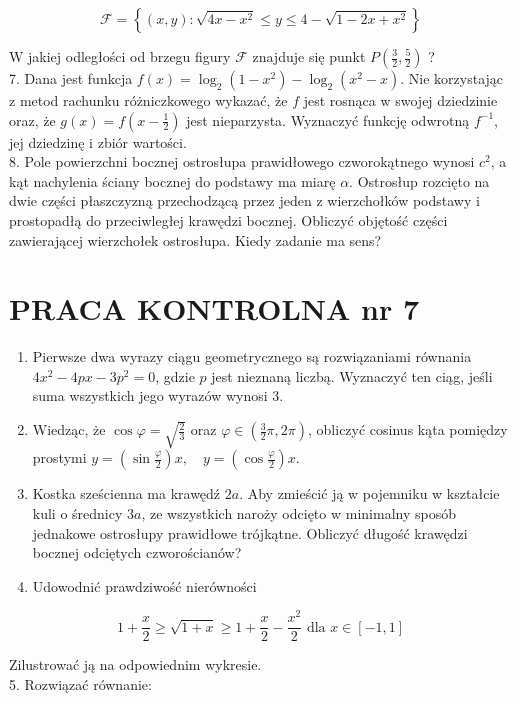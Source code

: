 \documentclass[10pt]{article}
\begin{document}
$$
\mathcal{F}=\left\{(x, y): \sqrt{4 x-x^{2}} \leqslant y \leqslant 4-\sqrt{1-2 x+x^{2}}\right\}
$$

W jakiej odległości od brzegu figury $\mathcal{F}$ znajduje się punkt $P\left(\frac{3}{2}, \frac{5}{2}\right)$ ?\\
7. Dana jest funkcja $f(x)=\log _{2}\left(1-x^{2}\right)-\log _{2}\left(x^{2}-x\right)$. Nie korzystając z metod rachunku różniczkowego wykazać, że $f$ jest rosnąca w swojej dziedzinie oraz, że $g(x)=f\left(x-\frac{1}{2}\right)$ jest nieparzysta. Wyznaczyć funkcję odwrotną $f^{-1}$, jej dziedzinę i zbiór wartości.\\
8. Pole powierzchni bocznej ostrosłupa prawidłowego czworokątnego wynosi $c^{2}$, a kąt nachylenia ściany bocznej do podstawy ma miarę $\alpha$. Ostrosłup rozcięto na dwie części płaszczyzną przechodzącą przez jeden z wierzchołków podstawy i prostopadłą do przeciwległej krawędzi bocznej. Obliczyć objętość części zawierającej wierzchołek ostrosłupa. Kiedy zadanie ma sens?

\section*{PRACA KONTROLNA nr 7}
\begin{enumerate}
  \item Pierwsze dwa wyrazy ciągu geometrycznego są rozwiązaniami równania $4 x^{2}-4 p x-3 p^{2}=0$, gdzie $p$ jest nieznaną liczbą. Wyznaczyć ten ciąg, jeśli suma wszystkich jego wyrazów wynosi 3.
  \item Wiedząc, że $\cos \varphi=\sqrt{\frac{2}{3}}$ oraz $\varphi \in\left(\frac{3}{2} \pi, 2 \pi\right)$, obliczyć cosinus kąta pomiędzy prostymi $y=\left(\sin \frac{\varphi}{2}\right) x, \quad y=\left(\cos \frac{\varphi}{2}\right) x$.
  \item Kostka sześcienna ma krawędź $2 a$. Aby zmieścić ją w pojemniku w kształcie kuli o średnicy $3 a$, ze wszystkich naroży odcięto w minimalny sposób jednakowe ostrosłupy prawidłowe trójkątne. Obliczyć długość krawędzi bocznej odciętych czworościanów?
  \item Udowodnić prawdziwość nierówności
\end{enumerate}

$$
1+\frac{x}{2} \geqslant \sqrt{1+x} \geqslant 1+\frac{x}{2}-\frac{x^{2}}{2} \text { dla } x \in[-1,1]
$$

Zilustrować ją na odpowiednim wykresie.\\
5. Rozwiązać równanie:
\end{document}
